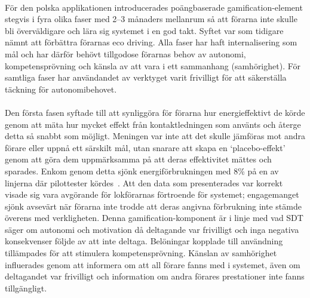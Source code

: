 \paragraph{}
\hspace{-11pt}För den polska applikationen introducerades poängbaserade gamification-element stegvis i fyra olika faser med 2--3 månaders mellanrum så att förarna inte skulle bli överväldigare och lära sig systemet i en god takt.
Syftet var som tidigare nämnt att förbättra förarnas eco driving.
Alla faser har haft internalisering som mål och har därför behövt tillgodose förarnas behov av autonomi, kompetensprövning och känsla av att vara i ett sammanhang (samhörighet).
För samtliga faser har användandet av verktyget varit frivilligt för att säkerställa täckning för autonomibehovet.
\paragraph{}
\hspace{-11pt}Den första fasen syftade till att synliggöra för förarna hur energieffektivt de körde genom att mäta hur mycket effekt från kontaktledningen som använts och återge detta så snabbt som möjligt.
Meningen var inte att det skulle jämföras mot andra förare eller uppnå ett särskilt mål, utan snarare att skapa en \lq{}placebo-effekt\rq{} genom att göra dem uppmärksamma på att deras effektivitet mättes och sparades.
Enkom genom detta sjönk energiförbrukningen med 8\% på en av linjerna där pilottester kördes~\cite{Cwil2018}.
Att den data som presenterades var korrekt visade sig vara avgörande för lokförarnas förtroende för systemet; engagemanget sjönk avsevärt när förarna inte trodde att deras angivna förbrukning inte stämde överens med verkligheten.
Denna gamification-komponent är i linje med vad SDT säger om autonomi och motivation då deltagande var frivilligt och inga negativa konsekvenser följde av att inte deltaga.
Belöningar kopplade till användning tillämpades för att stimulera kompetensprövning.
Känslan av samhörighet influerades genom att informera om att all förare fanns med i systemet, även om deltagandet var frivilligt och information om andra förares prestationer inte fanns tillgängligt.

